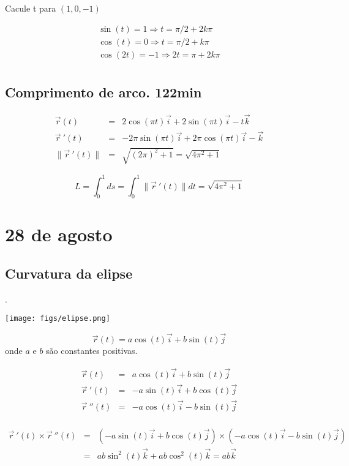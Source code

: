 \documentclass[a4paper,10pt]{book}
\begin{document}
 Cacule t para $(1,0,-1)$
 
 \begin{eqnarray*}
\sin(t)=1 \Longrightarrow t = \pi/2 + 2k\pi\\
\cos(t)=0 \Longrightarrow t = \pi/2 + k\pi\\
 \cos(2t)=-1 \Longrightarrow 2t = \pi + 2k\pi\\
 \end{eqnarray*}

 \section{Comprimento de arco. 122min}
 
 \begin{eqnarray*}
 \vec{r}(t)&=&2\cos(\pi t)\vec{i}+2\sin(\pi t)\vec{i}-t\vec{k}\\
  \vec{r}\!~'(t)&=&-2\pi\sin(\pi t)\vec{i}+2\pi\cos(\pi t)\vec{i}-\vec{k}\\
  \|\vec{r}\!~'(t)\|&=&\sqrt{(2\pi)^2+1}=\sqrt{4\pi^2+1}
 \end{eqnarray*}
 
 $$L=\int_0^1ds = \int_0^1\|\vec{r}\!~'(t)\|dt=\sqrt{4\pi^2+1}$$
 
 \chapter{28 de agosto}

 \section{Curvatura da elipse}.
 
 \begin{center}
 \texttt{[image: figs/elipse.png]}
 \end{center}
 
 $$\vec{r}(t)=a\cos(t)\vec{i}+b\sin(t)\vec{j}$$
 onde $a$ e $b$ são constantes positivas. 
 
 \begin{eqnarray*}
  \vec{r}(t)&=&a\cos(t)\vec{i}+b\sin(t)\vec{j}\\
  \vec{r}\!~'(t)&=&-a\sin(t)\vec{i}+b\cos(t)\vec{j}\\
  \vec{r}\!~''(t)&=&-a\cos(t)\vec{i}-b\sin(t)\vec{j}\\
 \end{eqnarray*}

 \begin{eqnarray*}
  \vec{r}\!~'(t)\times \vec{r}\!~''(t)&=&\left(-a\sin(t)\vec{i}+b\cos(t)\vec{j}\right)\times \left(-a\cos(t)\vec{i}-b\sin(t)\vec{j}\right)\\
  &=&ab\sin^2(t)\vec{k}+ab\cos^2(t)\vec{k}= ab\vec{k}
   \end{eqnarray*}
\end{document}
